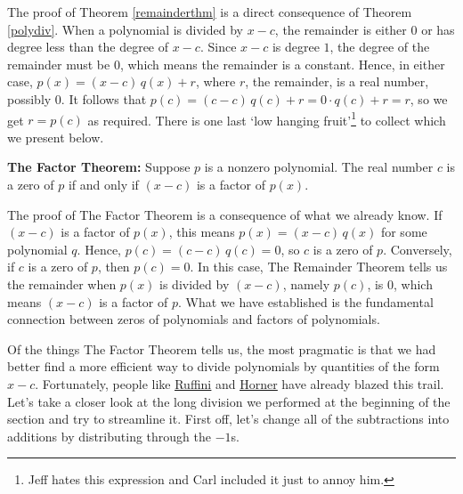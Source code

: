 \smallskip


The proof of Theorem \ref{remainderthm} is a direct consequence of Theorem \ref{polydiv}.  When a polynomial is divided by $x-c$, the remainder is either $0$ or has degree less than the degree of $x-c$.  Since $x-c$ is degree $1$, the degree of the remainder must be $0$, which means the remainder is a constant.  Hence, in either case, $p(x) = (x-c) \, q(x) + r$, where $r$, the remainder, is a real number, possibly $0$.  It follows that $p(c) = (c-c) \, q(c) + r = 0 \cdot q(c) + r = r$, so we get $r = p(c)$ as required.  There is one last `low hanging fruit'\footnote{Jeff hates this expression and Carl included it just to annoy him.} to collect which we present below.

\smallskip

\colorbox{ResultColor}{\bbm

\begin{thm} \label{factorthm}\textbf{The Factor Theorem:}  Suppose $p$ is a nonzero polynomial.  The real number $c$ is a zero of $p$ if and only if $(x-c)$ is a factor of $p(x)$.  

\end{thm}
\ebm}

\smallskip

The proof of The Factor Theorem is a consequence of what we already know.  If $(x-c)$ is a factor of $p(x)$, this means $p(x) = (x-c) \, q(x)$ for some polynomial $q$.  Hence, $p(c) = (c-c) \, q(c) = 0$, so $c$ is a zero of $p$.  Conversely, if $c$ is a zero of $p$, then $p(c) = 0$. In this case, The Remainder Theorem tells us the remainder when $p(x)$ is divided by $(x-c)$, namely $p(c)$, is $0$, which means $(x-c)$ is a factor of $p$.  What we have established is the fundamental connection between zeros of polynomials and factors of polynomials.  

\smallskip

Of the things The Factor Theorem tells us, the most pragmatic is that we had better find a more efficient way to divide polynomials by quantities of the form $x-c$.  Fortunately, people like \href{http://en.wikipedia.org/wiki/Synthetic_division}{\underline{Ruffini}} and \href{http://en.wikipedia.org/wiki/Horner_scheme}{\underline{Horner}} have already blazed this trail.  Let's take a closer look at the long division we performed at the beginning of the section and try to streamline it.  First off, let's change all of the subtractions into additions by distributing through the $-1$s.


